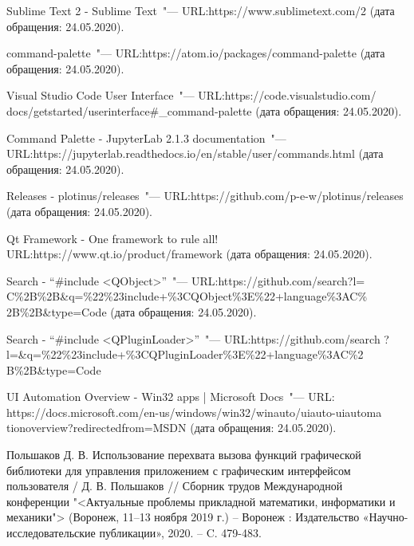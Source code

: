 \renewcommand{\bibname}{Список использованных источников}
\begin{thebibliography}{99}

 Sublime Text 2 \-- Sublime Text~"---
URL:\@ https://www.sublimetext.com/2
(дата обращения: 24.05.2020).

 command-palette~"---
URL:\@ https://atom.io/packages/command-palette
(дата обращения: 24.05.2020).

 Visual Studio Code User Interface~"---
URL:\@ https://code.visualstudio.com/\allowbreak
docs/getstarted/userinterface\#\_command-palette
(дата обращения: 24.05.2020).

 Command Palette \-- JupyterLab 2.1.3 documentation~"---
URL:\@ https://\allowbreak jupyterlab.readthedocs.io/en/stable/user/commands.html
(дата обращения: 24.05.2020).

 Releases \-- plotinus/releases~"---
URL:\@  https://github.com/p-e-w/plotinus/\allowbreak releases
(дата обращения: 24.05.2020).

 Qt Framework - One framework to rule all!
URL:\@ https://www.qt.io/product/\allowbreak framework
(дата обращения: 24.05.2020).

 Search \-- ``\#include <QObject>''~"---
URL:\@ https://github.com/search?l=\allowbreak
C\%2B\%2B\&q=\%22\%23include+\%3CQObject\%3E\%22+language\%3AC\%\allowbreak
2B\%2B\&type=Code
(дата обращения: 24.05.2020).

 Search \-- ``\#include <QPluginLoader>''~"---
URL:\@ https://github.com/search\allowbreak
?l=\&q=\%22\%23include+\%3CQPluginLoader\%3E\%22+language\%3AC\%2\allowbreak
B\%2B\&type=Code

 UI Automation Overview \-- Win32 apps |
Microsoft Docs~"--- URL:\@
https://docs.microsoft.com/en-us/windows/win32/winauto/uiauto-uiautoma\allowbreak
tionoverview?redirectedfrom=MSDN
(дата обращения: 24.05.2020).

 Польшаков Д. В. Использование перехвата вызова функций
графической библиотеки для управления приложением с графическим интерфейсом
пользователя / Д. В. Польшаков // Сборник трудов Международной конференции
"<Актуальные проблемы прикладной математики, информатики и механики">
(Воронеж, 11–13 ноября 2019 г.) – Воронеж : Издательство «Научно-исследовательские
публикации», 2020. – C. 479-483.


\end{thebibliography}
